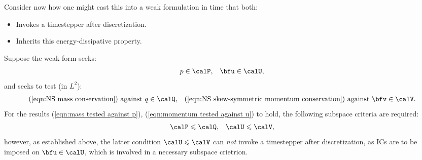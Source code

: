     Consider now how one might cast this into a weak formulation in time that both:
    \begin{itemize}
        \item  Invokes a timestepper after discretization.
        \item  Inherits this energy-dissipative property.
    \end{itemize}
    Suppose the weak form seeks:
    \begin{align}
           p  \in  \calP,  &&
        \bfu  \in  \calU,
    \end{align}
    and seeks to test (in $L^{2}$):
    \begin{align}
                           \text{(\ref{eqn:NS mass conservation}) against }    q \in \calQ,  &&
        \text{(\ref{eqn:NS skew-symmetric momentum conservation}) against } \bfv \in \calV.
    \end{align}
    For the results (\ref{eqn:mass tested against p}), (\ref{eqn:momentum tested against u}) to hold, the following subspace criteria are required:
    \begin{align}
        \calP  \leqslant  \calQ,  &&
        \calU  \leqslant  \calV,
    \end{align}
    however, as established above, the latter condition $\calU  \leqslant  \calV$ can \emph{not} invoke a timestepper after discretization, as ICs are to be imposed on $\bfu  \in  \calU$, which is involved in a necessary subspace crietrion. \contra
    
